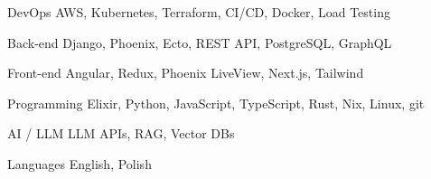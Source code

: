 

\begin{cvskills}

  \cvskill
    {DevOps} %
    {AWS, Kubernetes, Terraform, CI/CD, Docker, Load Testing} %

  \cvskill
    {Back-end} %
    {Django, Phoenix, Ecto, REST API, PostgreSQL, GraphQL} %

  \cvskill
    {Front-end} %
    {Angular, Redux, Phoenix LiveView, Next.js, Tailwind} %

  \cvskill
    {Programming} %
    {Elixir, Python, JavaScript, TypeScript, Rust, Nix, Linux, git} %

  \cvskill
    {AI / LLM} %
    {LLM APIs, RAG, Vector DBs} %

  \cvskill
    {Languages} %
    {English, Polish} %

\end{cvskills}
